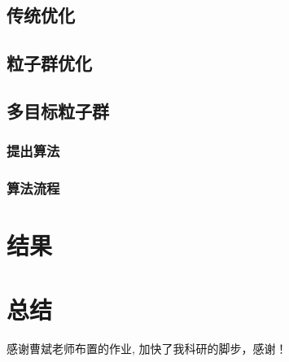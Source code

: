 \documentclass{HEBUTMaster}   %
\begin{document}
\section{传统优化}

\section{粒子群优化}

\section{多目标粒子群}

\subsection{提出算法}

\subsection{算法流程}

\chapter{结果}

\chapter{总结}




\cleardoublepage{}
{}
\begin{thebibliography}{000}

  
\end{thebibliography}


\acknowledgement
感谢曹斌老师布置的作业, 加快了我科研的脚步，感谢！


\cleardoublepage
\end{document}

